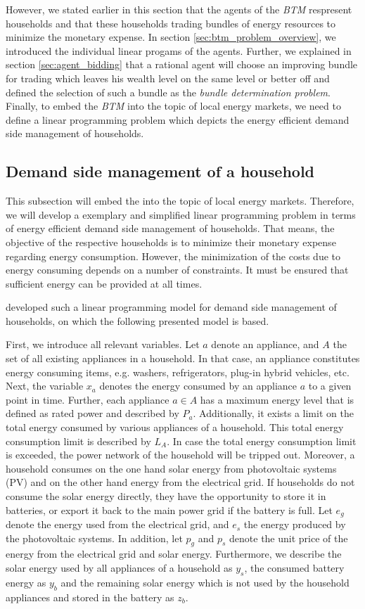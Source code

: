 However, we stated earlier in this section that the agents of the \textit{BTM} respresent households
and that these households trading bundles of energy resources to minimize the monetary expense. 
In section \ref{sec:btm_problem_overview}, we introduced the individual linear progams of the agents.
Further, we explained in section \ref{sec:agent_bidding} that a rational agent will choose an improving bundle for 
trading which leaves his wealth level on the same level or better off and defined the selection of such a bundle 
as the \textit{bundle determination problem}.
Finally, to embed the \textit{BTM} into the topic of local energy markets, we need to define 
a linear programming problem which depicts the energy efficient demand side management of households.

\subsection{Demand side management of a household}
This subsection will embed the  into the topic of local energy markets. 
Therefore, we will develop a exemplary and simplified linear programming problem in terms of energy efficient demand side management of households.  
That means, the objective of the respective households is to minimize their monetary expense regarding energy consumption.
However, the minimization of the costs due to energy consuming depends on a number of constraints. 
It must be ensured that sufficient energy can be provided at all times.

 developed such a linear programming model for demand side management of households, on which the following
presented model is based. 

First, we introduce all relevant variables. Let $a$ denote an appliance, and $A$ the set of all existing appliances in a household.
In that case, an appliance constitutes energy consuming items, e.g. washers, refrigerators, plug-in hybrid vehicles, etc.
Next, the variable $x_{a}$ denotes the energy consumed by an appliance $a$  to a given point in time. 
Further, each appliance $a \in A$ has a maximum energy level that is defined as rated power and described by $P_{a}$.
Additionally, it exists a limit on the total energy consumed by various appliances of a household. This total 
energy consumption limit is described by $L_{A}$. In case the total energy consumption limit is exceeded, the power network of 
the household will be tripped out.
Moreover, a household consumes on the one hand solar energy from
photovoltaic systems (PV) and on the other hand energy from the electrical grid. 
If households do not consume the solar energy directly, they have the opportunity to 
store it in batteries, or export it back to the main power grid if the battery is full.
Let $e_{g}$ denote the energy used from the electrical grid, and $e_{s}$ the energy produced by the photovoltaic systems.
In addition, let $p_{g}$ and $p_{s}$ denote the unit price of the energy from the electrical grid and solar energy.
Furthermore, we describe the solar energy used by all appliances of a household as $y_{s}$, the consumed battery energy 
as $y_{b}$ and the remaining solar energy which is not used by the household appliances and stored in the battery as $z_{b}$.


